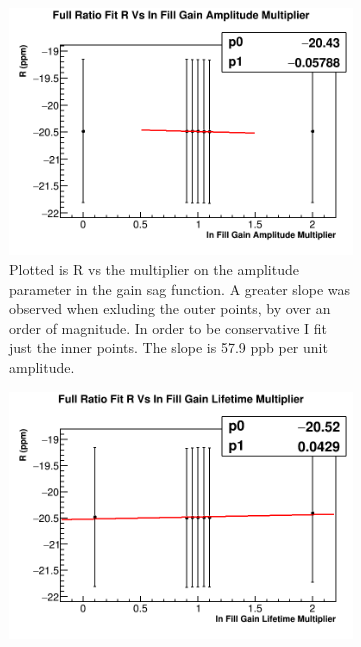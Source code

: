 		\begin{figure}[]
		\centering
		    \begin{subfigure}[t]{0.45\textwidth}
			    \centering
				\includegraphics[width=\textwidth]{R_Vs_IFG_Amp_crystals}
			    \caption{Plotted is R vs the multiplier on the amplitude parameter in the gain sag function. A greater slope was observed when exluding the outer points, by over an order of magnitude. In order to be conservative I fit just the inner points. The slope is 57.9 ppb per unit amplitude.}
		    \end{subfigure}
		    \hspace{4mm}
		    \begin{subfigure}[t]{0.45\textwidth}
			    \centering
				\includegraphics[width=\textwidth]{R_Vs_IFG_Tau_crystals}

\end{subfigure}
\end{figure}
